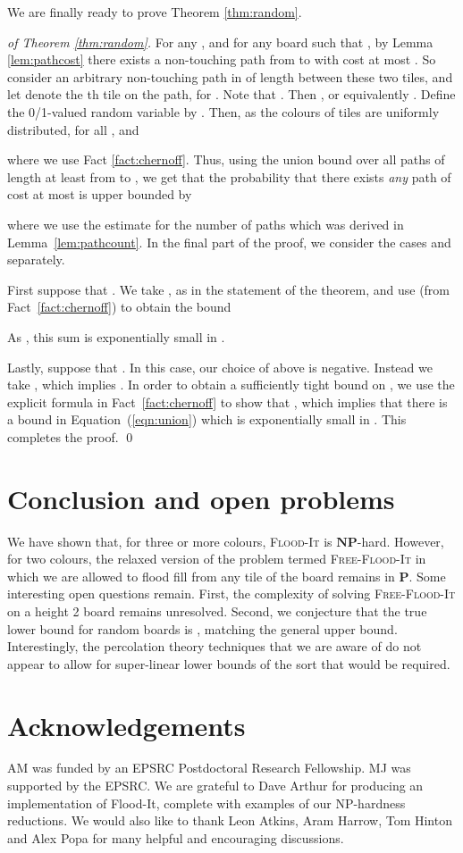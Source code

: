 \documentclass[a4paper,11pt]{llncs}
\newcounter{l}
\newcommand{\Ptime}{\ensuremath{\mathbf{P}}}
\newcommand{\NPtime}{\ensuremath{\mathbf{NP}}}
\newcommand{\ColoroidF}{\textsc{Free-Flood-It}}
\newcommand{\Floodit}{\textsc{Flood-It}}
\begin{document}
\noindent We are finally ready to prove Theorem \ref{thm:random}.

\begin{proof}[of Theorem \ref{thm:random}]
    For any , and for any board  such that , by Lemma \ref{lem:pathcost} there exists a non-touching path from  to  with cost at most . So consider an arbitrary non-touching path  in  of length  between these two tiles, and let  denote the th tile on the path, for . Note that . Then , or equivalently . Define the 0/1-valued random variable  by . Then, as the colours of tiles are uniformly distributed,  for all , and

where we use Fact \ref{fact:chernoff}. Thus, using the union bound over all paths of length at least  from  to , we get that the probability that there exists {\em any} path of cost at most  is upper bounded by

where we use the estimate for the number of paths which was derived in Lemma~\ref{lem:pathcount}. In the final part of the proof, we consider the cases  and  separately.

    First suppose that . We take , as in the statement of the theorem, and use  (from Fact~\ref{fact:chernoff}) to obtain the bound

As , this sum is exponentially small in .

    Lastly, suppose that . In this case, our choice of  above is negative. Instead we take , which implies . In order to obtain a sufficiently tight bound on , we use the explicit formula in Fact~\ref{fact:chernoff} to show that , which implies that there is a bound in Equation~(\ref{eqn:union}) which is exponentially small in . This completes the proof.
    \qed
\end{proof}


\section{Conclusion and open problems} \label{sec:conc}
We have shown that, for three or more colours, \Floodit{} is \NPtime-hard. However, for two colours, the relaxed version of the problem termed \ColoroidF{} in which we are allowed to flood fill from any tile of the board remains in \Ptime. Some interesting open questions remain. First, the complexity of solving \ColoroidF{} on a height 2 board remains unresolved. Second, we conjecture that the true lower bound for random boards is , matching the general upper bound. Interestingly, the percolation theory techniques that we are aware of do not appear to allow for super-linear lower bounds of the sort that would be required.

\section{Acknowledgements}
AM was funded by an EPSRC Postdoctoral Research Fellowship. MJ was supported by the EPSRC. We are grateful to Dave Arthur for producing an implementation of Flood-It, complete with examples of our NP-hardness reductions.  We
would also like to thank Leon Atkins, Aram Harrow, Tom Hinton and Alex Popa for many helpful and encouraging discussions.




\end{document}
